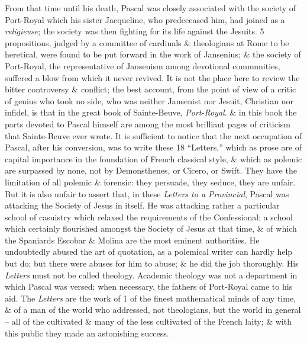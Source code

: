 \documentclass{article}
\begin{document}
\begin{enumerate}
\begin{itemize}
		From that time until his death, {\sc Pascal} was closely associated with the society of Port-Royal which his sister {\sc Jacqueline}, who predeceased him, had joined as a {\it religieuse}; the society was then fighting for its life against the Jesuits. 5 propositions, judged by a committee of cardinals \& theologians at Rome to be heretical, were found to be put forward in the work of Jansenius; \& the society of Port-Royal, the representative of Jansenism among devotional communities, suffered a blow from which it never revived. It is not the place here to review the bitter controversy \& conflict; the best account, from the point of view of a critic of genius who took no side, who was neither Jansenist nor Jesuit, Christian nor infidel, is that in the great book of {\sc Sainte-Beuve}, {\it Port-Royal}. \& in this book the parts devoted to {\sc Pascal} himself are among the most brilliant pages of criticism that {\sc Sainte-Beuve} ever wrote. It is sufficient to notice that the next occupation of {\sc Pascal}, after his conversion, was to write these 18 ``Letters,'' which as prose are of capital importance in the foundation of French classical style, \& which as polemic are surpassed by none, not by {\sc Demonsthenes}, or {\sc Cicero}, or {\sc Swift}. They have the limitation of all polemic \& forensic: they persuade, they seduce, they are unfair. But it is also unfair to assert that, in these {\it Letters to a Provincial}, {\sc Pascal} was attacking the Society of Jesus in itself. He was attacking rather a particular school of casuistry which relaxed the requirements of the Confessional; a school which certainly flourished amongst the Society of Jesus at that time, \& of which the {\sc Spaniards Escobar \& Molina} are the most eminent authorities. He undoubtedly abused the art of quotation, as a polemical writer can hardly help but do; but there were abuses for him to abuse; \& he did the job thoroughly. His {\it Letters} must not be called theology. Academic theology was not a department in which {\sc Pascal} was versed; when necessary, the fathers of Port-Royal came to his aid. The {\it Letters} are the work of 1 of the finest mathematical minds of any time, \& of a man of the world who addressed, not theologians, but the world in general -- all of the cultivated \& many of the less cultivated of the French laity; \& with this public they made an astonishing success.
		

\end{itemize}
\end{enumerate}
\end{document}
